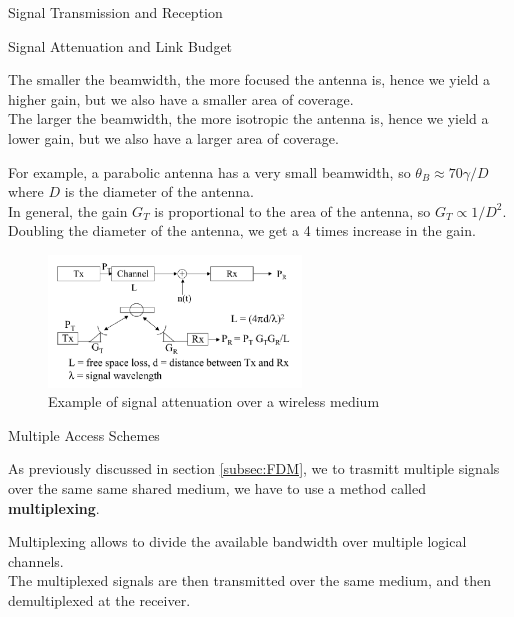 \begin{section}{Signal Transmission and Reception}
\begin{subsection}{Signal Attenuation and Link Budget}
    \begin{boxH}
      The smaller the beamwidth, the more focused the antenna is, hence we yield a higher gain, but
      we also have a smaller area of coverage.\\
      The larger the beamwidth, the more isotropic the antenna is, hence we yield a lower gain, but
      we also have a larger area of coverage.\\
    \end{boxH}
    For example, a parabolic antenna has a very small beamwidth, so $\theta_B \approx 70\gamma/D$
    where $D$ is the diameter of the antenna.\\
    In general, the gain $G_T$ is proportional to the area of the antenna, so $G_T\propto 1/D^2$.
    Doubling the diameter of the antenna, we get a 4 times increase in the gain.\\

    \begin{figure}[H]
      \centering
      \includegraphics[width=0.6\textwidth]{img/wireless/signal attenuation.png}
      \caption{Example of signal attenuation over a wireless medium}
      \label{fig:antenna gain}
    \end{figure}
  \end{subsection}
  \begin{subsection}{Multiple Access Schemes}
    \begin{boxH}
      As previously discussed in section \ref{subsec:FDM}, we to trasmitt multiple signals over the same
      same shared medium, we have to use a method called \textbf{multiplexing}.
    \end{boxH}
    Multiplexing allows to divide the available bandwidth over multiple logical channels.\\
    The multiplexed signals are then transmitted over the same medium, and then demultiplexed at the
    receiver.\\


\end{subsection}
\end{section}
